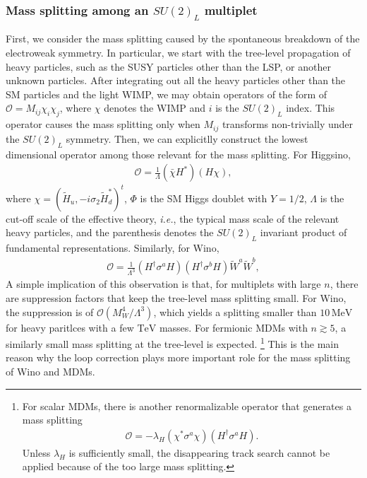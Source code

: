 \documentclass[12pt,twoside,book]{article}
\begin{document}
\subsubsection*{Mass splitting among an $SU(2)_L$ multiplet}

First, we consider the mass splitting caused by the spontaneous breakdown of the electroweak symmetry.
In particular, we start with the tree-level propagation of heavy particles, such as the SUSY particles other than the LSP, or another unknown particles.
After integrating out all the heavy particles other than the SM particles and the light WIMP, we may obtain operators of the form of $\mathcal{O} = M_{i j} \chi_i \chi_j$, where $\chi$ denotes the WIMP and $i$ is the $SU(2)_L$ index.
This operator causes the mass splitting only when $M_{i j}$ transforms non-trivially under the $SU(2)_L$ symmetry.
Then, we can explicitlly construct the lowest dimensional operator among those relevant for the mass splitting.
For Higgsino,
\begin{align}
  \mathcal{O} = \frac{1}{\Lambda} (\bar{\chi} H^{*}) (H \chi),
  \label{eq:Higgsino_mass_splitting}
\end{align}
where $\chi = (\tilde{H}_u, -i \sigma_2 \tilde{H}_d^{*})^t$, $\Phi$ is the SM Higgs doublet with $Y = 1/2$, $\Lambda$ is the cut-off scale of the effective theory, \textit{i.e.}, the typical mass scale of the relevant heavy particles, and the parenthesis denotes the $SU(2)_L$ invariant product of fundamental representations.
Similarly, for Wino, \cite{Gherghetta:1999sw}
\begin{align}
  \mathcal{O} = \frac{1}{\Lambda^3} (H^\dagger \sigma^a H) (H^\dagger \sigma^b H) \tilde{W}^a \tilde{W}^b,
  \label{eq:Wino_mass_splitting}
\end{align}
A simple implication of this observation is that, for multiplets with large $n$, there are suppression factors that keep the tree-level mass splitting small.
For Wino, the suppression is of $\mathcal{O} (M_W^4 / \Lambda^3)$, which yields a splitting smaller than $10\,\mathrm{MeV}$ for heavy paritlces with a few $\mathrm{TeV}$ masses.
For fermionic MDMs with $n \gtrsim 5$, a similarly small mass splitting at the tree-level is expected.
\footnote{
  For scalar MDMs, there is another renormalizable operator that generates a mass splitting
  \begin{align*}
    \mathcal{O} = - \lambda_H \left( \chi^{*} \sigma^a \chi \right) \left( H^\dagger \sigma^a H \right).
  \end{align*}
  Unless $\lambda_H$ is sufficiently small, the disappearing track search cannot be applied because of the too large mass splitting.
}
This is the main reason why the loop correction plays more important role for the mass splitting of Wino and MDMs.
\end{document}
